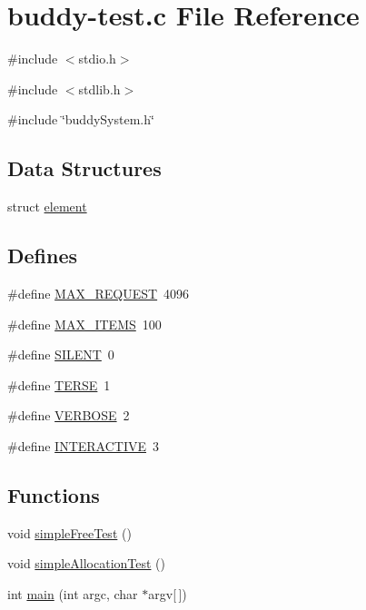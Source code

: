 \hypertarget{buddy-test_8c}{
\section{buddy-\/test.c File Reference}
\label{buddy-test_8c}
}
{\ttfamily \#include $<$stdio.h$>$}\par
{\ttfamily \#include $<$stdlib.h$>$}\par
{\ttfamily \#include \char`\"{}buddySystem.h\char`\"{}}\par
\subsection*{Data Structures}
\begin{DoxyCompactItemize}
\item 
struct \hyperlink{structelement}{element}
\end{DoxyCompactItemize}
\subsection*{Defines}
\begin{DoxyCompactItemize}
\item 
\#define \hyperlink{buddy-test_8c_a79dc55ceff5acfd97aabd01db632a266}{MAX\_\-REQUEST}~4096
\item 
\#define \hyperlink{buddy-test_8c_a1b40ceb455086d9cdb68ed3d3bf2775f}{MAX\_\-ITEMS}~100
\item 
\#define \hyperlink{buddy-test_8c_a404d5107b2cc06d2e236b7320df1fa7d}{SILENT}~0
\item 
\#define \hyperlink{buddy-test_8c_ae70000f46dd84121830128e1701090ee}{TERSE}~1
\item 
\#define \hyperlink{buddy-test_8c_a42f8c497a1968074f38bf5055c650dca}{VERBOSE}~2
\item 
\#define \hyperlink{buddy-test_8c_aa68dfac40a260bde9272c46bdf82613a}{INTERACTIVE}~3
\end{DoxyCompactItemize}
\subsection*{Functions}
\begin{DoxyCompactItemize}
\item 
void \hyperlink{buddy-test_8c_aef4bcb90051645261dc7ccb937ca0693}{simpleFreeTest} ()
\item 
void \hyperlink{buddy-test_8c_a3b7d9bb211264a0f07a2083546c4748b}{simpleAllocationTest} ()
\item 
int \hyperlink{buddy-test_8c_a0ddf1224851353fc92bfbff6f499fa97}{main} (int argc, char $\ast$argv\mbox{[}$\,$\mbox{]})
\end{DoxyCompactItemize}
